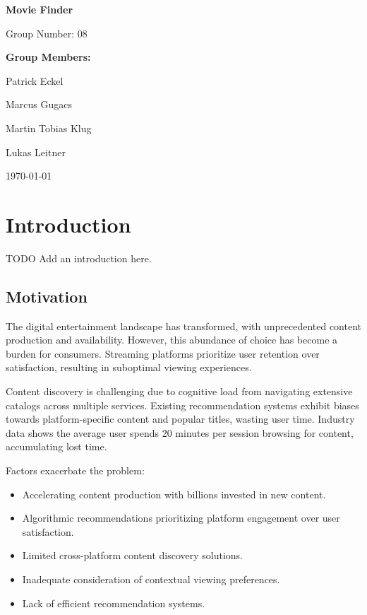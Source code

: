 \documentclass[12pt,a4paper]{article}
\begin{document}
  \begin{titlepage}
    \begin{center}
      \vspace*{2cm}
      {\huge\bfseries Movie Finder\par}
      \vspace{2cm}
      {\Large Group Number: 08\par}
      \vspace{1.5cm}
      {\large\bfseries Group Members:\par}
      \vspace{0.5cm}
      {\large
      Patrick Eckel\par
      Marcus Gugacs\par
      Martin Tobias Klug\par
      Lukas Leitner\par
      }
      \vfill
      {\large \today\par}
    \end{center}
  \end{titlepage}

  \tableofcontents
  \newpage


  \section{Introduction}

  TODO Add an introduction here.

  \subsection{Motivation}

  The digital entertainment landscape has transformed, with unprecedented content production and availability.
  However, this abundance of choice has become a burden for consumers. Streaming platforms prioritize user retention
  over satisfaction, resulting in suboptimal viewing experiences.

  \noindent Content discovery is challenging due to cognitive load from navigating extensive catalogs across multiple services.
  Existing recommendation systems exhibit biases towards platform-specific content and popular titles, wasting user time.
  Industry data shows the average user spends 20 minutes per session browsing for content, accumulating lost time.

  \noindent Factors exacerbate the problem:
  \begin{itemize}
    \item Accelerating content production with billions invested in new content.
    \item Algorithmic recommendations prioritizing platform engagement over user satisfaction.
    \item Limited cross-platform content discovery solutions.
    \item Inadequate consideration of contextual viewing preferences.
    \item Lack of efficient recommendation systems.
  \end{itemize}
\end{document}
